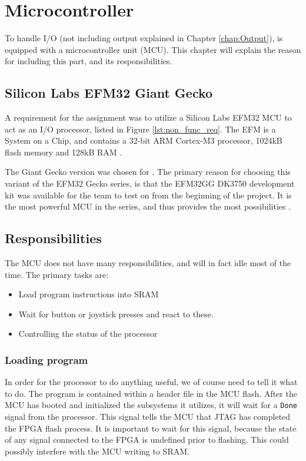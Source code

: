 \chapter{Microcontroller}

To handle I/O (not including output explained in Chapter \ref{chap:Output}), \vthreek is equipped with a microcontroller unit (MCU).
This chapter will explain the reason for including this part, and its responsibilities. 

\section{Silicon Labs EFM32 Giant Gecko}
A requirement for the assignment was to utilize a Silicon Labs EFM32 MCU to act as an I/O processor, listed in Figure \ref{lst:non_func_req}.
The EFM is a System on a Chip, and contains a 32-bit ARM Cortex-M3 processor, 1024kB flash memory and 128kB RAM \cite{efm32referencemanual}.

The Giant Gecko version was chosen for \vthreek.
The primary reason for choosing this variant of the EFM32 Gecko series, is that the EFM32GG DK3750 development kit was available for the team to test on from the beginning of the project.
It is the most powerful MCU in the series, and thus provides the most possibilities \cite{}.

\section{Responsibilities}
The MCU does not have many responsibilities, and will in fact idle most of the time. 
The primary tasks are: 
\begin{itemize}
\item Load program instructions into SRAM
\item Wait for button or joystick presses and react to these.
\item Controlling the status of the processor
\end{itemize}

\subsection{Loading program}
In order for the processor to do anything useful, we of course need to tell it what to do.
The program is contained within a header file in the MCU flash.
After the MCU has booted and initialized the subsystems it utilizes, it will wait for a \texttt{Done} signal from the processor.
This signal tells the MCU that JTAG has completed the FPGA flash process. 
It is important to wait for this signal, because the state of any signal connected to the FPGA is undefined prior to flashing.
This could possibly interfere with the MCU writing to SRAM.

